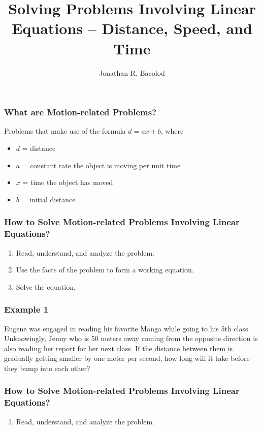\documentclass[14pt]{beamer}
\title[] {Solving Problems Involving Linear Equations -- Distance, Speed, and Time}
\author{Jonathan R. Bacolod}
\institute[SHS]{Sauyo High School}
\date{}
\begin{document}
	\frame{\titlepage}
	
	\begin{frame}
		\frametitle{What are Motion-related Problems?}
		Problems that make use of the formula $ d = ax + b $, where
	
		\begin{itemize} 
			\item \pause $ d $ = distance
			\item \pause $ a $ = constant rate the object is moving per unit time
			\item \pause  $ x $ = time the object has moved 
			\item \pause $ b $ = initial distance
		\end{itemize} 
	\end{frame}

    \begin{frame}
    	\frametitle{How  to Solve Motion-related Problems Involving Linear Equations?}
    	
    	\begin{enumerate}  
    		\item Read, understand, and analyze the problem. 
    		\item \pause Use the facts of the problem to form a working equation.
    		\item \pause Solve the equation.
    	\end{enumerate}  
    \end{frame}

    \begin{frame}
    	\frametitle{Example 1}
    	Eugene was engaged in reading his favorite Manga while going to his 5th class.
    	Unknowingly, Jenny who is 50 meters away coming from the opposite direction is also reading her report for her next class. If the distance between them is gradually getting smaller by one meter per second, how long will it take before they bump into each other?
    \end{frame}

    \begin{frame}
    	\frametitle{How  to Solve Motion-related Problems Involving Linear Equations?}
    	
    	\begin{enumerate}  
    		\item Read, understand, and analyze the problem. 
    	\end{enumerate}  
    \end{frame}
\end{document}
